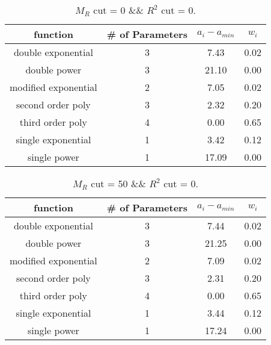 \begin{table}[H] 
\begin{center} 
\begin{tabular}{|c|c|c|c|} 
\hline function & \# of Parameters & $a_i-a_{min}$ & $w_i$ \\ \hline 
double exponential &  3 &   7.43 &   0.02 \\ 
double power &  3 &  21.10 &   0.00 \\ 
modified exponential &  2 &   7.05 &   0.02 \\ 
second order poly &  3 &   2.32 &   0.20 \\ 
third order poly &  4 &   0.00 &   0.65 \\ 
single exponential &  1 &   3.42 &   0.12 \\ 
single power &  1 &  17.09 &   0.00 \\ 
\hline 
\end{tabular} 
\caption{$M_R$ cut = 0 \&\& $R^2$ cut = 0.} 
\label{tab:FitChoices_0_0} 
\end{center} 
\end{table} 
 
 
\begin{table}[H] 
\begin{center} 
\begin{tabular}{|c|c|c|c|} 
\hline function & \# of Parameters & $a_i-a_{min}$ & $w_i$ \\ \hline 
double exponential &  3 &   7.44 &   0.02 \\ 
double power &  3 &  21.25 &   0.00 \\ 
modified exponential &  2 &   7.09 &   0.02 \\ 
second order poly &  3 &   2.31 &   0.20 \\ 
third order poly &  4 &   0.00 &   0.65 \\ 
single exponential &  1 &   3.44 &   0.12 \\ 
single power &  1 &  17.24 &   0.00 \\ 
\hline 
\end{tabular} 
\caption{$M_R$ cut = 50 \&\& $R^2$ cut = 0.} 
\label{tab:FitChoices_50_0} 
\end{center} 
\end{table} 
 
